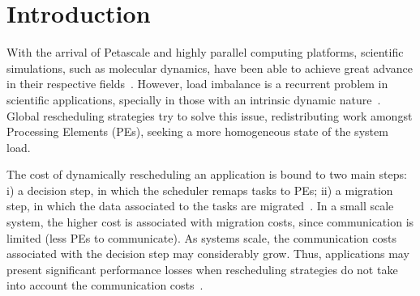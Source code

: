 \section{Introduction}

With the arrival of Petascale and highly parallel computing platforms, scientific simulations, such as molecular dynamics, have been able to achieve great advance in their respective fields~\cite{namd,IPDPS13:LULESH}.
However, load imbalance is a recurrent problem in scientific applications, specially in those with an intrinsic dynamic nature~\cite{Deveci2015}.
Global rescheduling strategies try to solve this issue, redistributing work amongst Processing Elements (PEs), seeking a more homogeneous state of the system load.


The cost of dynamically rescheduling an application is bound to two main steps: i) a decision step, in which the scheduler remaps tasks to PEs; ii) a migration step, in which the data associated to the tasks are migrated~\cite{pillaphd}.
In a small scale system, the higher cost is associated with migration costs, since communication is limited (less PEs to communicate).
As systems scale, the communication costs associated with the decision step may considerably grow. Thus, applications may present significant performance losses when rescheduling strategies do not take into account the communication costs~\cite{grapevine}.

